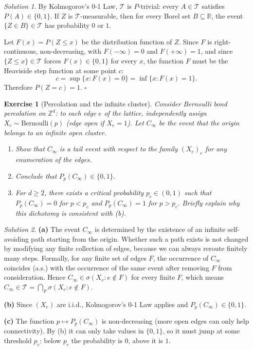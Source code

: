 \documentclass[12pt]{article}
\newtheorem{exercise}{Exercise}
\theoremstyle{remark}
\newtheorem*{solution}{Solution}
\begin{document}
\begin{solution}
By Kolmogorov's 0-1 Law, $\mathcal{T}$ is $P$-trivial: every $A \in \mathcal{T}$
satisfies $P(A) \in \{0,1\}$.  If $Z$ is $\mathcal{T}$-measurable, then for every
Borel set $B \subseteq \mathbb{R}$, the event $\{Z \in B\} \in \mathcal{T}$ has
probability $0$ or $1$.

Let $F(x) = P(Z \le x)$ be the distribution function of $Z$.  Since $F$ is
right-continuous, non-decreasing, with $F(-\infty)=0$ and $F(+\infty)=1$, and since
$\{Z \le x\} \in \mathcal{T}$ forces $F(x) \in \{0,1\}$ for every $x$, the function
$F$ must be the Heaviside step function at some point $c$:
\[
  c = \sup\{x : F(x) = 0\} = \inf\{x : F(x) = 1\}.
\]
Therefore $P(Z = c) = 1$. \hfill$\square$
\end{solution}

\begin{exercise}[Percolation and the infinite cluster]
Consider Bernoulli bond percolation on $\mathbb{Z}^d$: to each edge $e$ of the lattice,
independently assign $X_e \sim \mathrm{Bernoulli}(p)$ (edge \emph{open} if $X_e = 1$).
Let $C_\infty$ be the event that the origin belongs to an infinite open cluster.
\begin{enumerate}
  \item[(a)] Show that $C_\infty$ is a tail event with respect to the family $(X_e)_{e}$
             for any enumeration of the edges.
  \item[(b)] Conclude that $P_p(C_\infty) \in \{0, 1\}$.
  \item[(c)] For $d \ge 2$, there exists a critical probability $p_c \in (0,1)$ such that
             $P_p(C_\infty) = 0$ for $p < p_c$ and $P_p(C_\infty) = 1$ for $p > p_c$.
             Briefly explain why this dichotomy is consistent with (b).
\end{enumerate}
\end{exercise}

\begin{solution}
\textbf{(a)} The event $C_\infty$ is determined by the existence of an infinite self-avoiding
path starting from the origin.  Whether such a path exists is not changed by modifying
any finite collection of edges, because we can always reroute finitely many steps.
Formally, for any finite set of edges $F$, the occurrence of $C_\infty$ coincides (a.s.)
with the occurrence of the same event after removing $F$ from consideration.
Hence $C_\infty \in \sigma(X_e : e \notin F)$ for every finite $F$, which means
$C_\infty \in \mathcal{T} = \bigcap_F \sigma(X_e : e \notin F)$.

\textbf{(b)} Since $(X_e)$ are i.i.d., Kolmogorov's 0-1 Law applies and
$P_p(C_\infty) \in \{0,1\}$.

\textbf{(c)} The function $p \mapsto P_p(C_\infty)$ is non-decreasing (more open edges
can only help connectivity).  By (b) it can only take values in $\{0,1\}$, so it
must jump at some threshold $p_c$: below $p_c$ the probability is $0$, above it is $1$.
\end{solution}
\end{document}
